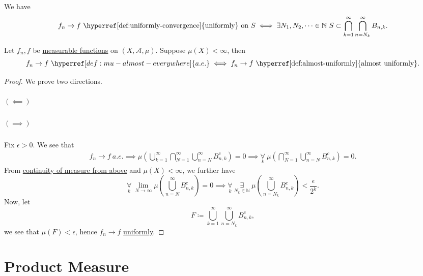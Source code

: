 \begin{lemma}
	We have
	\[
		f_{n}\to f \text{ \hyperref[def:uniformly-convergence]{uniformly} on } S \iff \exists N_1, N_2, \dots\in \mathbb{N}\ S\subset \bigcap_{k=1}^{\infty} \bigcap_{n=N_k}^{\infty} B_{n, k}.
	\]
\end{lemma}

\begin{theorem}\label{thm:Egorov-theorem}
	Let \(f_{n}, f\) be \hyperref[def:measurable-function]{measurable functions} on \((X, \mathcal{A} , \mu )\). Suppose \(\mu (X)<\infty \), then
	\[
		f_{n}\to f\ \hyperref[def:mu-almost-everywhere]{a.e.} \iff f_{n}\to f\text{ \hyperref[def:almost-uniformly]{almost uniformly}}.
	\]
\end{theorem}
\begin{proof}
	We prove two directions.
	\paragraph{\((\impliedby)\)}

	\paragraph{\((\implies )\)}
	Fix \(\epsilon > 0\). We see that
	\[
		\begin{split}
			f_{n}\to f\ \hyperref[def:mu-almost-everywhere]{a.e.}
			\implies \mu \left(\bigcup_{k=1}^{\infty} \bigcap_{N=1}^{\infty} \bigcup_{n=N}^{\infty} B_{n, k}^{c} \right) = 0
			\implies \underset{k}{\forall}\ \mu \left(\bigcap_{N=1}^{\infty} \bigcup_{n=N}^{\infty} B_{n, k}^{c} \right) = 0.
		\end{split}
	\]
	From \hyperref[thm:measure-space-continuity-from-above]{continuity of measure from above} and \(\mu (X)<\infty \), we further have
	\[
		\underset{k}{\forall}\ \lim_{N \to \infty} \mu \left(\bigcup_{n=N}^{\infty} B_{n, k}^{c} \right) = 0 \implies \underset{k}{\forall}\ \underset{ N_{k}\in\mathbb{N}}{\exists}\ \mu \left(\bigcup_{n=N_{k}}^{\infty} B_{n, k}^{c} \right)< \frac{\epsilon}{2^k}.
	\]
	Now, let
	\[
		F \coloneqq \bigcup_{k=1}^{\infty} \bigcup_{n=N_{k}}^{\infty} B_{n, k}^{c} ,
	\]
	we see that \(\mu (F) < \epsilon \), hence \(f_{n}\to f\) \hyperref[def:uniformly-convergence]{uniformly}.
\end{proof}

\chapter{Product Measure}\label{ch:Product-Measure}
